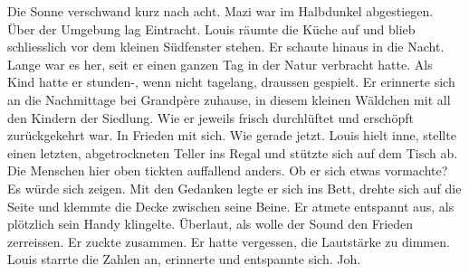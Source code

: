 \sectionbreak  

Die Sonne verschwand kurz nach acht. Mazi war im Halbdunkel abgestiegen.
Über der Umgebung lag Eintracht. Louis räumte die Küche auf und blieb schliesslich vor dem kleinen
Südfenster stehen. Er schaute hinaus in die Nacht. Lange war es her,
seit er einen ganzen Tag in der Natur verbracht hatte. Als Kind hatte er
stunden-, wenn nicht tagelang, draussen gespielt. Er erinnerte sich an
die Nachmittage bei Grandpère zuhause, in diesem kleinen Wäldchen mit
all den Kindern der Siedlung. Wie er jeweils frisch durchlüftet und
erschöpft zurückgekehrt war. In Frieden mit sich. Wie gerade jetzt. Louis
hielt inne, stellte einen letzten, abgetrockneten Teller ins Regal und
stützte sich auf dem Tisch ab. 
Die Menschen hier oben tickten auffallend anders. Ob er sich etwas
vormachte? Es würde sich zeigen.
Mit den Gedanken legte er sich ins Bett, drehte sich auf die Seite und
klemmte die Decke zwischen seine Beine. Er atmete entspannt aus, als
plötzlich sein Handy klingelte. Überlaut, als wolle der Sound den
Frieden zerreissen. Er zuckte zusammen. Er hatte vergessen, die
Lautstärke zu dimmen. Louis starrte die Zahlen an, erinnerte und
entspannte sich. Joh.
